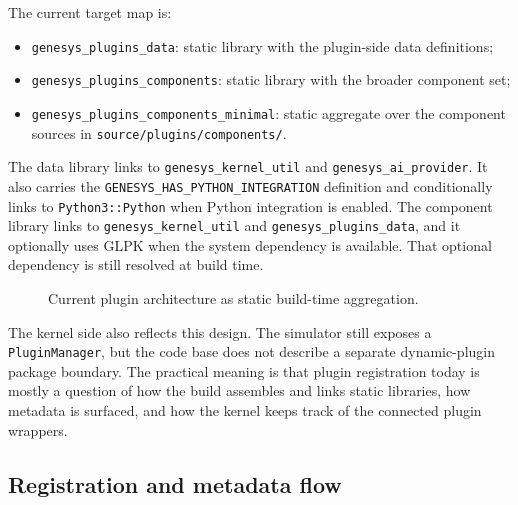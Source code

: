 The current target map is:
\begin{itemize}
 \item \texttt{genesys\_plugins\_data}: static library with the plugin-side
   data definitions;
 \item \texttt{genesys\_plugins\_components}: static library with the broader
   component set;
 \item \texttt{genesys\_plugins\_components\_minimal}: static aggregate over
   the component sources in \texttt{source/plugins/components/}.
\end{itemize}

The data library links to \texttt{genesys\_kernel\_util} and
\texttt{genesys\_ai\_provider}. It also carries the
\texttt{GENESYS\_HAS\_PYTHON\_INTEGRATION} definition and conditionally links
to \texttt{Python3::Python} when Python integration is enabled. The component
library links to \texttt{genesys\_kernel\_util} and
\texttt{genesys\_plugins\_data}, and it optionally uses GLPK when the system
dependency is available. That optional dependency is still resolved at build
time.

\begin{figure}[htbp]
\caption{Current plugin architecture as static build-time aggregation.}
\label{fig:plugin-static-architecture}
\end{figure}

The kernel side also reflects this design. The simulator still exposes a
\texttt{PluginManager}, but the code base does not describe a separate
dynamic-plugin package boundary. The practical meaning is that plugin
registration today is mostly a question of how the build assembles and links
static libraries, how metadata is surfaced, and how the kernel keeps track of
the connected plugin wrappers.

\subsection{Registration and metadata flow}
\label{subsec:plugin-registration-metadata}

